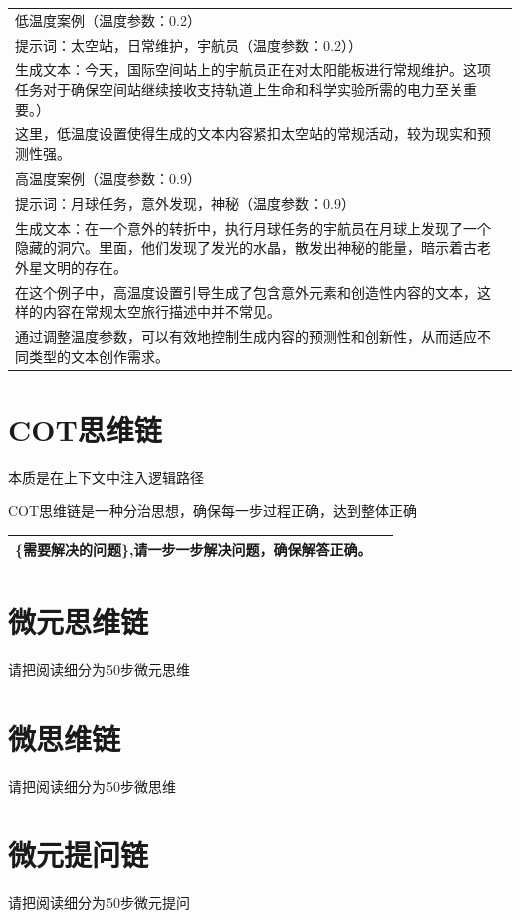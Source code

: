\documentclass[12pt]{book}
\begin{document}
\begin{tabular}{|p{15cm}|p{3cm}|}
	\hline
低温度案例（温度参数：0.2）\\
提示词：太空站，日常维护，宇航员（温度参数：0.2））\\
生成文本：今天，国际空间站上的宇航员正在对太阳能板进行常规维护。这项任务对于确保空间站继续接收支持轨道上生命和科学实验所需的电力至关重要。）\\
这里，低温度设置使得生成的文本内容紧扣太空站的常规活动，较为现实和预测性强。\\
高温度案例（温度参数：0.9）\\
提示词：月球任务，意外发现，神秘（温度参数：0.9）\\
生成文本：在一个意外的转折中，执行月球任务的宇航员在月球上发现了一个隐藏的洞穴。里面，他们发现了发光的水晶，散发出神秘的能量，暗示着古老外星文明的存在。\\
在这个例子中，高温度设置引导生成了包含意外元素和创造性内容的文本，这样的内容在常规太空旅行描述中并不常见。\\
通过调整温度参数，可以有效地控制生成内容的预测性和创新性，从而适应不同类型的文本创作需求。\\
	\hline
\end{tabular}

\section{COT思维链}
本质是在上下文中注入逻辑路径

\bigskip
COT思维链是一种分治思想，确保每一步过程正确，达到整体正确

\begin{tabular}{|p{15cm}|p{3cm}|}
	\hline
\{需要解决的问题\},请一步一步解决问题，确保解答正确。\\
	\hline
\end{tabular}

\section{微元思维链}
请把阅读细分为50步微元思维

\section{微思维链}
请把阅读细分为50步微思维

\section{微元提问链}
请把阅读细分为50步微元提问
\end{document}
